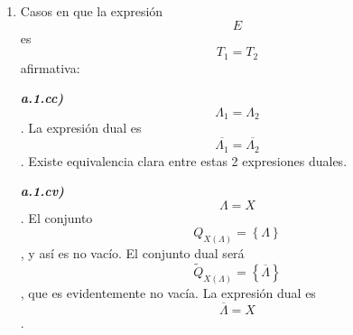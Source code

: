\begin{enumerate}
\begin{enumerate}
\begin{enumerate}
\begin{enumerate}
\begin{enumerate}
{          previamente que ver cuál es el dual de un recorrido \textbf{Q}
          en \textbf{B}, que será el conjunto de los elementos de
          \textbf{B} que son inversos de los elementos de \textbf{Q}, ya
          que para cada constante o valor que tome una variable, el dual
          será el dual de esa constante o valor, esto es, el complemento
          de esa constante o valor. Para una variable \textbf{a}, el
          conjunto de valores que recorre es
          \textbf{Q}}\textsubscript{\emph{\textbf{a}}}\emph{ . Si
          necesi\-tamos algún conjunto auxiliar lo llamaremos \textbf{A}
          y se de\-finirá antes de su uso con la idea que no sea
          demasiado engorrosa la escritura. Si un conjunto \textbf{C} es
          sin el 1 lo denotaremos por
          \textbf{C}}\textsubscript{\emph{\textbf{*}}}\emph{ y si es sin
          el 0 lo denotaremos
          \textbf{C}}\textsuperscript{\emph{\textbf{*}}}\emph{ y
          definimos
          \textbf{B}}\textsubscript{\emph{\textbf{2}}}\emph{\textbf{=\{0,1\}}
          y si un conjunto \textbf{C} es sin 0 y sin 1 lo denotamos por
          \textbf{C}}\textsuperscript{\emph{\textbf{X}}}\emph{. Otro
          elemento importante son los paréntesis, que permiten una no
          asociatividad generali\-zada entre las diversas operaciones,
          al no cambiar en absoluto en la expresión dual.}
        \item
          Casos en que la expresión \[E\] es\[T_{1} = T_{2}\]afirmativa:

          \emph{\textbf{a.1.cc)}} \[\Lambda_{1} = \Lambda_{2}\]. La
          expresión dual es
          \[\overline{\Lambda_{1}} = \overline{\Lambda_{2}}\]. Existe
          equivalencia cla\-ra entre estas 2 expresiones duales.

          \emph{\textbf{a.1.cv)}} \[\Lambda = X\]. El conjunto
          \[Q_{X{(\Lambda)}} = \left\{ \Lambda \right\}\] , y así es no
          vacío. El conjunto dual será
          \[{\widetilde{Q}}_{X{(\Lambda)}} = \left\{ \overline{\Lambda} \right\}\],
          que es evidentemente no vacía. La expresión dual es
          \[\overline{\Lambda} = X\].


\end{enumerate}
\end{enumerate}
\end{enumerate}
\end{enumerate}
\end{enumerate}
